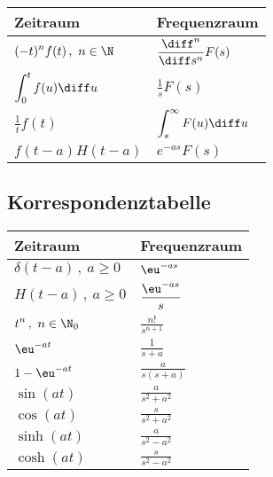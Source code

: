 		\begin{center}
			\begin{tabular}{l@{$\qquad$}l}
				\toprule
				Zeitraum & Frequenzraum \\
				\midrule
				$\displaystyle
				(-t)^n f(t)\,,\ n\in\N
				$ & $\displaystyle
				\frac{\diff^n}{\diff s^n} F(s)
				$ \\
				$\displaystyle
				\int_0^t f(u) \diff u
				$ & $\displaystyle
				\frac{1}{s} F(s)
				$ \\
				$\displaystyle
				\frac{1}{t} f(t)
				$ & $\displaystyle
				\int_s^\infty F(u) \diff u
				$ \\
				$\displaystyle
				f(t-a) H(t-a)
				$ & $\displaystyle
				e^{-as} F(s)
				$ \\
				\bottomrule
			\end{tabular}
		\end{center}
	
	\subsection{Korrespondenztabelle} %
		\begin{center}
			\begin{tabular}{l@{$\qquad$}l}
				\toprule
				Zeitraum & Frequenzraum \\
				\midrule
				$\displaystyle
				\delta(t-a)\,,\ a\geq 0
				$ & $\displaystyle
				\eu^{-as}
				$ \\
				$\displaystyle
				 H(t - a)\,,\ a\geq 0 
				$ & $\displaystyle
				 \frac{\eu^{-as}}{s} 
				$ \\
				$\displaystyle
				 t^n\,,\ n\in\N_0 
				$ & $\displaystyle
				 \frac{n!}{s^{n+1}} 
				$ \\
				$\displaystyle
				 \eu^{-at} 
				$ & $\displaystyle
				 \frac{1}{s+a} 
				$ \\
				$\displaystyle
				1- \eu^{-at}
				$ & $\displaystyle
				 \frac{a}{s(s+a)} 
				$ \\
				$\displaystyle
				\sin(at)
				$ & $\displaystyle
				\frac{a}{s^2+a^2}
				$ \\
				$\displaystyle
				\cos(at)
				$ & $\displaystyle
				\frac{s}{s^2+a^2}
				$ \\
				$\displaystyle
				\sinh(at)
				$ & $\displaystyle
				\frac{a}{s^2-a^2}
				$ \\
				$\displaystyle
				\cosh(at)
				$ & $\displaystyle
				\frac{s}{s^2-a^2}
				$ \\
				\bottomrule
			\end{tabular}
		\end{center}

